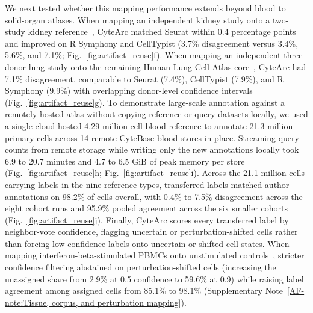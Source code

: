 \documentclass[11pt]{article}
\newcommand{\sref}[1]{\ref*{AF-#1}}
\begin{document}
We next tested whether this mapping performance extends beyond blood to solid-organ atlases. When mapping an independent kidney study onto a two-study kidney reference~\cite{reck2025multiomic,lake2025cellular,stewart2019spatiotemporal}, CyteArc matched Seurat within 0.4 percentage points and improved on R Symphony and CellTypist (3.7\% disagreement versus 3.4\%, 5.6\%, and 7.1\%; Fig.~\ref{fig:artifact_reuse}f). When mapping an independent three-donor lung study onto the remaining Human Lung Cell Atlas core~\cite{madissoon2019scrnaseq,sikkema2023}, CyteArc had 7.1\% disagreement, comparable to Seurat (7.4\%), CellTypist (7.9\%), and R Symphony (9.9\%) with overlapping donor-level confidence intervals (Fig.~\ref{fig:artifact_reuse}g). To demonstrate large-scale annotation against a remotely hosted atlas without copying reference or query datasets locally, we used a single cloud-hosted 4.29-million-cell blood reference to annotate 21.3 million primary cells across 14 remote CyteBase blood stores in place. Streaming query counts from remote storage while writing only the new annotations locally took 6.9 to 20.7 minutes and 4.7 to 6.5 GiB of peak memory per store (Fig.~\ref{fig:artifact_reuse}h; Fig.~\ref{fig:artifact_reuse}i). Across the 21.1 million cells carrying labels in the nine reference types, transferred labels matched author annotations on 98.2\% of cells overall, with 0.4\% to 7.5\% disagreement across the eight cohort runs and 95.9\% pooled agreement across the six smaller cohorts (Fig.~\ref{fig:artifact_reuse}j). Finally, CyteArc scores every transferred label by neighbor-vote confidence, flagging uncertain or perturbation-shifted cells rather than forcing low-confidence labels onto uncertain or shifted cell states. When mapping interferon-beta-stimulated PBMCs onto unstimulated controls~\cite{kang2018}, stricter confidence filtering abstained on perturbation-shifted cells (increasing the unassigned share from 2.9\% at 0.5 confidence to 59.6\% at 0.9) while raising label agreement among assigned cells from 85.1\% to 98.1\% (Supplementary Note~\sref{note:Tissue, corpus, and perturbation mapping}).
\end{document}
